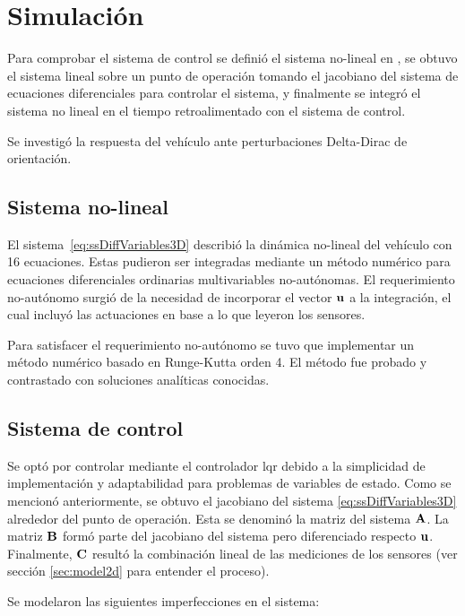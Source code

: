 \section{Simulación}

Para comprobar el sistema de control se definió el sistema no-lineal en \Matlab, se obtuvo el sistema lineal sobre un punto de operación tomando el jacobiano del sistema de ecuaciones diferenciales para controlar el sistema, y finalmente se integró el sistema no lineal en el tiempo retroalimentado con el sistema de control.

Se investigó la respuesta del vehículo ante perturbaciones Delta-Dirac de orientación.

\subsection{Sistema no-lineal}

El sistema~\eqref{eq:ssDiffVariables3D} describió la dinámica no-lineal del vehículo con 16 ecuaciones. Estas pudieron ser integradas mediante un método numérico para ecuaciones diferenciales ordinarias multivariables no-autónomas. El requerimiento no-autónomo surgió de la necesidad de incorporar el vector $\mathbf{u}$ a la integración, el cual incluyó las actuaciones en base a lo que leyeron los sensores. 

\medskip

Para satisfacer el requerimiento no-autónomo se tuvo que implementar un método numérico basado en Runge-Kutta orden 4. El método fue probado y contrastado con soluciones analíticas conocidas.

\subsection{Sistema de control}

Se optó por controlar mediante el controlador \gls{lqr} debido a la simplicidad de implementación y adaptabilidad para problemas de variables de estado. Como se mencionó anteriormente, se obtuvo el jacobiano del sistema \eqref{eq:ssDiffVariables3D} alrededor del punto de operación. Esta se denominó la matriz del sistema $\mathbf{A}$. La matriz $\mathbf{B}$ formó parte del jacobiano del sistema pero diferenciado respecto $\mathbf{u}$. Finalmente, $\mathbf{C}$ resultó la combinación lineal de las mediciones de los sensores (ver sección \ref{sec:model2d} para entender el proceso). 

Se modelaron las siguientes imperfecciones en el sistema:

